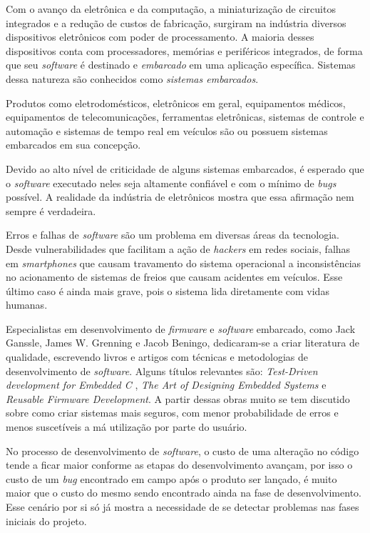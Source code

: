 \documentclass[times, twoside, watermark]{artigo}
\begin{document}
Com o avanço da eletrônica e da computação, a miniaturização de circuitos integrados
e a redução de custos de fabricação, surgiram na indústria diversos dispositivos
eletrônicos com poder de processamento. 
A maioria desses dispositivos conta com processadores, memórias e periféricos
integrados, de forma que seu \textit{software} é destinado e \textit{embarcado} 
em uma aplicação específica. Sistemas dessa natureza são conhecidos como
\textit{sistemas embarcados}.

Produtos como eletrodomésticos, eletrônicos em geral, equipamentos médicos,
equipamentos de telecomunicações, ferramentas eletrônicas, sistemas de controle 
e automação e sistemas de tempo real em veículos são ou possuem sistemas embarcados
em sua concepção.

Devido ao alto nível de criticidade de alguns sistemas embarcados, é esperado que o
\textit{software} executado neles seja altamente confiável e com o mínimo de
\textit{bugs} possível. 
A realidade da indústria de eletrônicos mostra que essa afirmação nem sempre é 
verdadeira.

Erros e falhas de \textit{software} são um problema em diversas áreas da tecnologia. 
Desde vulnerabilidades que facilitam a ação de \textit{hackers} em redes sociais,
falhas em \textit{smartphones} que causam travamento do sistema operacional a
inconsistências no acionamento de sistemas de freios que causam acidentes em
veículos. Esse último caso é ainda mais grave, pois o sistema lida diretamente com
vidas humanas. 

Especialistas em desenvolvimento de \textit{firmware} e \textit{software} embarcado, 
como Jack Ganssle, James W. Grenning e Jacob Beningo, dedicaram-se a criar 
literatura de qualidade, escrevendo livros e artigos com técnicas e 
metodologias de desenvolvimento de \textit{software}. 
Alguns títulos relevantes são: \textit{Test-Driven development for Embedded C}
\cite{tddembeddedc}, 
\textit{The Art of Designing Embedded Systems}\cite{ganssle2008art} e
\textit{Reusable Firmware Development}\cite{beningo2017reusable}. 
A partir dessas obras muito se tem discutido sobre como criar sistemas mais seguros, 
com menor probabilidade de erros e menos suscetíveis a má utilização por parte do 
usuário.

No processo de desenvolvimento de \textit{software}, o custo de uma alteração no 
código tende a ficar maior conforme  as etapas do desenvolvimento avançam, por isso 
o custo de um \textit{bug} encontrado em campo após o produto ser lançado, é muito 
maior que o custo do mesmo sendo encontrado ainda na fase de 
desenvolvimento\cite{firmwarecost}.
Esse cenário por si só já mostra a necessidade de se detectar problemas nas fases 
iniciais do projeto.
\end{document}
